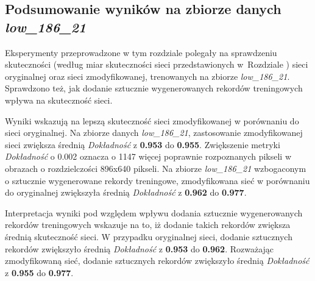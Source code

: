 \subsection{Podsumowanie wyników na zbiorze danych \textit{low\_186\_21}}
Eksperymenty przeprowadzone w tym rozdziale polegały na sprawdzeniu skuteczności (według miar skuteczności sieci przedstawionych w~Rozdziale ) sieci oryginalnej oraz sieci zmodyfikowanej, trenowanych na zbiorze \textit{low\_186\_21}.
Sprawdzono też, jak dodanie sztucznie wygenerowanych rekordów treningowych wpływa na skuteczność sieci.


Wyniki wskazują na lepszą skuteczność sieci zmodyfikowanej w porównaniu do sieci oryginalnej.
Na zbiorze danych \textit{low\_186\_21}, zastosowanie zmodyfikowanej sieci zwiększa średnią \textit{Dokładność} z \textbf{0.953} do \textbf{0.955}.
Zwiększenie metryki \textit{Dokładność} o 0.002 oznacza o 1147 więcej poprawnie rozpoznanych pikseli w obrazach o rozdzielczości 896x640 pikseli. Na zbiorze \textit{low\_186\_21} wzbogaconym o sztucznie wygenerowane rekordy treningowe, zmodyfikowana sieć w porównaniu do oryginalnej zwiększyła średnią \textit{Dokładność} z \textbf{0.962} do \textbf{0.977}.


Interpretacja wyniki pod względem wpływu dodania sztucznie wygenerowanych rekordów treningowych wskazuje na to, iż dodanie takich rekordów zwiększa średnią skuteczność sieci. W przypadku oryginalnej sieci, dodanie sztucznych rekordów zwiększyło średnią \textit{Dokładność} z \textbf{0.953} do \textbf{0.962}. Rozważając zmodyfikowaną sieć, dodanie sztucznych rekordów zwiększyło średnią \textit{Dokładność} z \textbf{0.955} do \textbf{0.977}.
